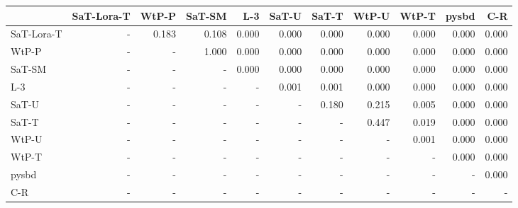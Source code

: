 \begin{tabular}{lrrrrrrrrrr}
\toprule
 & SaT-Lora-T & WtP-P & SaT-SM & L-3 & SaT-U & SaT-T & WtP-U & WtP-T & pysbd & C-R \\
\midrule
SaT-Lora-T & - & 0.183 & 0.108 & 0.000 & 0.000 & 0.000 & 0.000 & 0.000 & 0.000 & 0.000 \\
WtP-P & - & - & 1.000 & 0.000 & 0.000 & 0.000 & 0.000 & 0.000 & 0.000 & 0.000 \\
SaT-SM & - & - & - & 0.000 & 0.000 & 0.000 & 0.000 & 0.000 & 0.000 & 0.000 \\
L-3 & - & - & - & - & 0.001 & 0.001 & 0.000 & 0.000 & 0.000 & 0.000 \\
SaT-U & - & - & - & - & - & 0.180 & 0.215 & 0.005 & 0.000 & 0.000 \\
SaT-T & - & - & - & - & - & - & 0.447 & 0.019 & 0.000 & 0.000 \\
WtP-U & - & - & - & - & - & - & - & 0.001 & 0.000 & 0.000 \\
WtP-T & - & - & - & - & - & - & - & - & 0.000 & 0.000 \\
pysbd & - & - & - & - & - & - & - & - & - & 0.000 \\
C-R & - & - & - & - & - & - & - & - & - & - \\
\bottomrule
\end{tabular}

